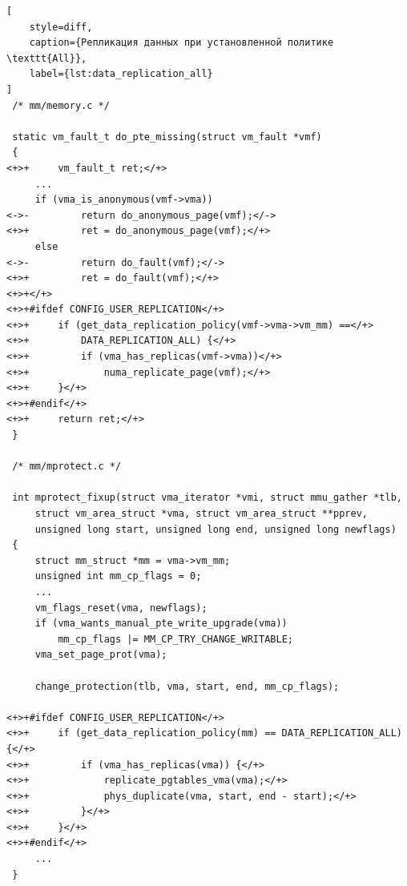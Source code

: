 
\begin{lstlisting}[
	style=diff,
	caption={Репликация данных при установленной политике \texttt{All}},
	label={lst:data_replication_all}
]
 /* mm/memory.c */

 static vm_fault_t do_pte_missing(struct vm_fault *vmf)
 {
<+>+	 vm_fault_t ret;</+>
	 ...
	 if (vma_is_anonymous(vmf->vma))
<->-		 return do_anonymous_page(vmf);</->
<+>+		 ret = do_anonymous_page(vmf);</+>
	 else
<->-		 return do_fault(vmf);</->
<+>+		 ret = do_fault(vmf);</+>
<+>+</+>
<+>+#ifdef CONFIG_USER_REPLICATION</+>
<+>+	 if (get_data_replication_policy(vmf->vma->vm_mm) ==</+>
<+>+		 DATA_REPLICATION_ALL) {</+>
<+>+		 if (vma_has_replicas(vmf->vma))</+>
<+>+			 numa_replicate_page(vmf);</+>
<+>+	 }</+>
<+>+#endif</+>
<+>+	 return ret;</+>
 }

 /* mm/mprotect.c */

 int mprotect_fixup(struct vma_iterator *vmi, struct mmu_gather *tlb,
	 struct vm_area_struct *vma, struct vm_area_struct **pprev,
	 unsigned long start, unsigned long end, unsigned long newflags)
 {
	 struct mm_struct *mm = vma->vm_mm;
	 unsigned int mm_cp_flags = 0;
	 ...
	 vm_flags_reset(vma, newflags);
	 if (vma_wants_manual_pte_write_upgrade(vma))
		 mm_cp_flags |= MM_CP_TRY_CHANGE_WRITABLE;
	 vma_set_page_prot(vma);

	 change_protection(tlb, vma, start, end, mm_cp_flags);

<+>+#ifdef CONFIG_USER_REPLICATION</+>
<+>+	 if (get_data_replication_policy(mm) == DATA_REPLICATION_ALL) {</+>
<+>+		 if (vma_has_replicas(vma)) {</+>
<+>+			 replicate_pgtables_vma(vma);</+>
<+>+			 phys_duplicate(vma, start, end - start);</+>
<+>+		 }</+>
<+>+	 }</+>
<+>+#endif</+>
	 ...
 }
\end{lstlisting}
\vspace{0.5cm}


